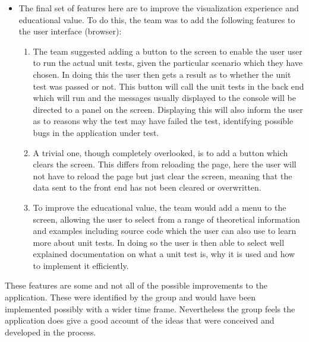 \documentclass[a4paper,12pt]{Article}
\begin{document}
\begin{itemize}
\item The final set of features here are to improve the visualization experience and educational value. To do this, the team was to add the following features to the user interface (browser):
\begin{enumerate}
\item The team suggested adding a button to the screen to enable the user user to run the actual unit tests, given the particular scenario which they have chosen. In doing this the user then gets a result as to whether the unit test was passed or not. This button will call the unit tests in the back end which will run and the messages usually displayed to the console will be directed to a panel on the screen. Displaying this will also inform the user as to reasons why the test may have failed the test, identifying possible bugs in the application under test.
\item A trivial one, though completely overlooked, is to add a button which clears the screen. This differs from reloading the page, here the user will not have to reload the page but just clear the screen, meaning that the data sent to the front end has not been cleared or overwritten.
\item To improve the educational value, the team would add a menu to the screen, allowing the user to select from a range of theoretical information and examples including source code which the user can also use to learn more about unit tests. In doing so the user is then able to select well explained documentation on what a unit test is, why it is used and how to implement it efficiently.
\end{enumerate}
\end{itemize}
These features are some and not all of the possible improvements to the application. These were identified by the group and would have been implemented possibly with a wider time frame. Nevertheless the group feels the application does give a good account of the ideas that were conceived and developed in the process.
\end{document}
